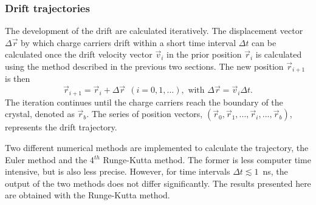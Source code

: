 \documentclass[epj,referee]{svjour}
\begin{document}
\subsubsection{Drift trajectories} 
\label{s:trj} 
The development of the drift are calculated iteratively. The
displacement vector $\Delta \vec{r}$ by which charge carriers drift
within a short time interval $\Delta t$ can be calculated once the
drift velocity vector $\vec{v}_{i}$ in the prior position
$\vec{r}_{i}$ is calculated using the method described in the previous
two sections.  The new position $\vec{r}_{i+1}$ is then
\begin{equation} 
\label{e:pos} 
\vec{r}_{i+1} = \vec{r}_{i} + \Delta \vec{r} \ \ 
(i=0,1,...), \mbox{ with } 
\Delta \vec{r} = \vec{v}_{i} \Delta t. 
\end{equation} 
The iteration continues until the charge carriers reach the boundary
of the crystal, denoted as $\vec{r}_{b}$. The series of position
vectors, $(\vec{r}_{0}, \vec{r}_{1}, ..., \vec{r}_{i}, ...,
\vec{r}_{b})$, represents the drift trajectory.
 
Two different numerical methods are implemented to calculate the
trajectory, the Euler method and the 4$^{th}$ Runge-Kutta method. The
former is less computer time intensive, but is also less precise.
However, for time intervals $\Delta t \lesssim 1$~ns, the output of
the two methods does not differ significantly. The results presented
here are obtained with the Runge-Kutta method.
 
\end{document}
